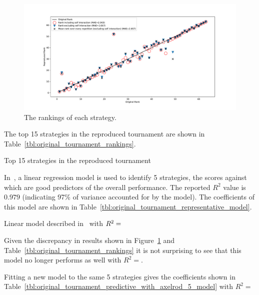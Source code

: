 \documentclass{article}
\begin{document}
\begin{figure}[!hbtp]
    \centering
    \includegraphics[width=.8\textwidth]{assets/original_tournament_rankings.pdf}
    \caption{The rankings of each strategy.}
    \label{fig:original_tournament_rankings}
\end{figure}

The top 15 strategies in the reproduced tournament are shown in
Table~\ref{tbl:original_tournament_rankings}.

\begin{table}[!hbtp]
        \centering
        
        \caption{Top 15 strategies in the reproduced tournament}
        \label{tbl:original_tournament_rankings}
\end{table}

In~\cite{Axelrod1980b}, a linear regression model is used to identify 5
strategies, the scores against which are good predictors of the overall
performance. The reported \(R^2\) value is \(0.979\) (indicating 97\% of
variance accounted for by the model). The coefficients of this model are shown
in Table~\ref{tbl:original_tournament_representative_model}.

\begin{table}[!hbtp]
        \centering
        
        \caption{Linear model described in~\cite{Axelrod1980b} with
             \(R^2=\protect\)}
        \label{tbl:original_tournament_representative_model}
\end{table}

Given the discrepancy in results shown in
Figure~\ref{fig:original_tournament_rankings} and
Table~\ref{tbl:original_tournament_rankings} it is not surprising to see that
this model no longer performs as well with
\(R^2=\).

Fitting a new model to the same 5 strategies gives the coefficients shown in
Table~\ref{tbl:original_tournament_predictive_with_axelrod_5_model} with
\(R^2=\)
\end{document}
